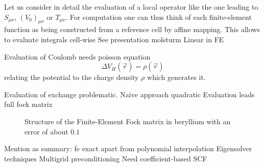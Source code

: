 Let us consider in detail the evaluation of a local operator
like the one leading to $S_{\mu\nu}$, $(V_0)_{\mu\nu}$ or $T_{\mu\nu}$.
For computation one can thus
think of each finite-element function
as being constructed from a reference cell
by affine mapping.
This allows to evaluate integrals cell-wise
See presentation molsturm
Linear in FE

Evaluation of Coulomb needs poisson equation
\begin{equation}
	\Delta V_H(\vec{r}) = \rho(\vec{r})
	\label{eqn:Poisson}
\end{equation}
relating the potential to the charge density $\rho$ which generates it.

Evaluation of exchange problematic.
Naive approach quadratic
Evaluation leads full fock matrix
\begin{figure}
	\centering
	\caption{Structure of the Finite-Element Fock matrix in beryllium
		with an error of about $0.1$}
	\label{fig:StructureFiniteElementFock}
\end{figure}


Mention as summary:
fe exact apart from polynomial interpolation
Eigensolver techniques
Multigrid preconditioning
Need coefficient-based SCF

